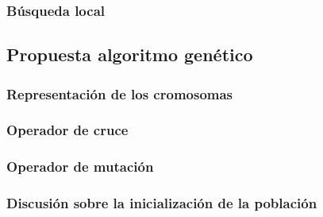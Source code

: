 \subsubsection{Búsqueda local}



\subsection{Propuesta algoritmo genético}

\subsubsection{Representación de los cromosomas}

\subsubsection{Operador de cruce}

\subsubsection{Operador de mutación}

\subsubsection{Discusión sobre la inicialización de la población}
